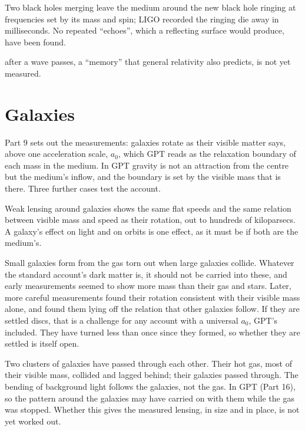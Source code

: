 \documentclass[11pt,a4paper]{article}
\begin{document}
 Two black holes merging leave the medium around the new black hole ringing at frequencies set by its mass and spin; LIGO recorded the ringing die away in milliseconds. No repeated ``echoes'', which a reflecting surface would produce, have been found.

 after a wave passes, a ``memory'' that general relativity also predicts, is not yet measured.

\section{Galaxies}

Part 9 sets out the measurements: galaxies rotate as their visible matter says, above one acceleration scale, $a_0$, which GPT reads as the relaxation boundary of each mass in the medium. In GPT gravity is not an attraction from the centre but the medium's inflow, and the boundary is set by the visible mass that is there. Three further cases test the account.

 Weak lensing around galaxies shows the same flat speeds and the same relation between visible mass and speed as their rotation, out to hundreds of kiloparsecs. A galaxy's effect on light and on orbits is one effect, as it must be if both are the medium's.

 Small galaxies form from the gas torn out when large galaxies collide. Whatever the standard account's dark matter is, it should not be carried into these, and early measurements seemed to show more mass than their gas and stars. Later, more careful measurements found their rotation consistent with their visible mass alone, and found them lying off the relation that other galaxies follow. If they are settled discs, that is a challenge for any account with a universal $a_0$, GPT's included. They have turned less than once since they formed, so whether they are settled is itself open.

 Two clusters of galaxies have passed through each other. Their hot gas, most of their visible mass, collided and lagged behind; their galaxies passed through. The bending of background light follows the galaxies, not the gas. In GPT  (Part 16), so the pattern around the galaxies may have carried on with them while the gas was stopped. Whether this gives the measured lensing, in size and in place, is not yet worked out.
\end{document}
